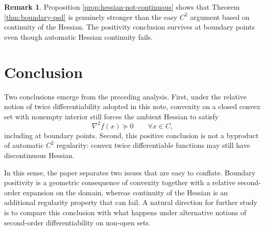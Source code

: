 \documentclass[reqno]{amsart}
\theoremstyle{definition}
\newtheorem{remark}[theorem]{Remark}
\begin{document}
\begin{remark}\label{rem:no-c2}
Proposition \ref{prop:hessian-not-continuous} shows that Theorem
\ref{thm:boundary-psd} is genuinely stronger than the easy $C^2$ argument based
on continuity of the Hessian. The positivity conclusion survives at boundary
points even though automatic Hessian continuity fails.
\end{remark}

\section{Conclusion}\label{sec:conclusion}

Two conclusions emerge from the preceding analysis. First, under the relative
notion of twice differentiability adopted in this note, convexity on a closed
convex set with nonempty interior still forces the ambient Hessian to satisfy
\[
    \nabla^2 f(x) \succeq 0 \qquad \forall x \in C,
\]
including at boundary points. Second, this positive conclusion is not a byproduct
of automatic $C^2$ regularity: convex twice differentiable functions may still
have discontinuous Hessian.

In this sense, the paper separates two issues that are easy to conflate.
Boundary positivity is a geometric consequence of convexity together with a
relative second-order expansion on the domain, whereas continuity of the Hessian
is an additional regularity property that can fail. A natural direction for
further study is to compare this conclusion with what happens under alternative
notions of second-order differentiability on non-open sets.



\end{document}
